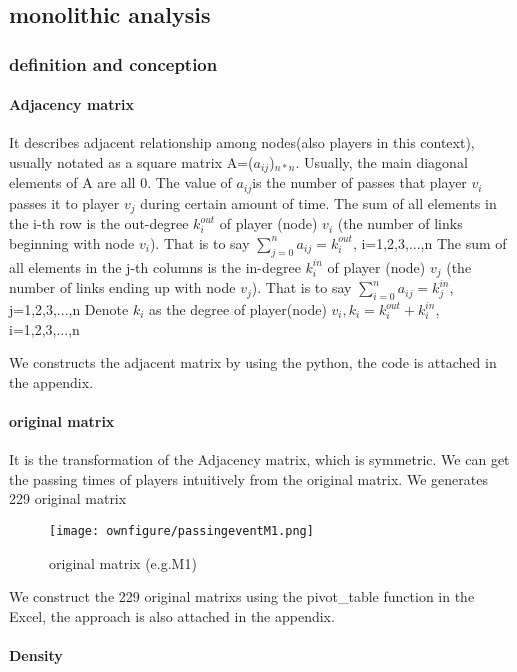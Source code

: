 \documentclass{mcmthesis}
\begin{document}
\subsection{monolithic analysis}
\subsubsection{definition and conception}
\paragraph{\textbf{Adjacency matrix}}

It describes adjacent relationship among nodes(also players in this
context), usually notated as a square matrix A=($a_{ij}$)$_{n*n}$.
Usually, the main diagonal elements of A are all 0. The value of $a_{ij}$is
the number of passes that player $v_{i}$ passes it to player $v_{j}$
during certain amount of time.
The sum of all elements in the i-th row is the out-degree $k_{i}^{out}$
of player (node) $v_{i}$ (the number of links beginning with node
$v_{i}$). That is to say $\sum_{j=0}^{n}a_{ij}=k_{i}^{out}$, i=1,2,3,...,n
The sum of all elements in the j-th columns is the in-degree $k_{i}^{in}$
of player (node) $v_{j}$ (the number of links ending up with node
$v_{j}$). That is to say $\sum_{i=0}^{n}a_{ij}=k_{j}^{in}$, j=1,2,3,...,n
Denote $k_{i}$ as the degree of player(node) $v_{i},$$k_{i}=k_{i}^{out}+k_{i}^{in}$, i=1,2,3,...,n

We constructs the adjacent matrix by using the python, the code is attached in the appendix.

\paragraph{\textbf{original matrix}}
It is the transformation of the Adjacency matrix, which is symmetric. We can get the passing times
of players intuitively from the original matrix. We generates 229 original matrix 

\begin{figure}[h]
  \small
  \centering
  \texttt{[image: ownfigure/passingeventM1.png]}
  \caption{original matrix (e.g.M1)} 
  \end{figure}

We construct the 229 original matrixs using the pivot_table function in the Excel, the
approach is also attached in the appendix.

\paragraph{\textbf{Density}}
\end{document}
